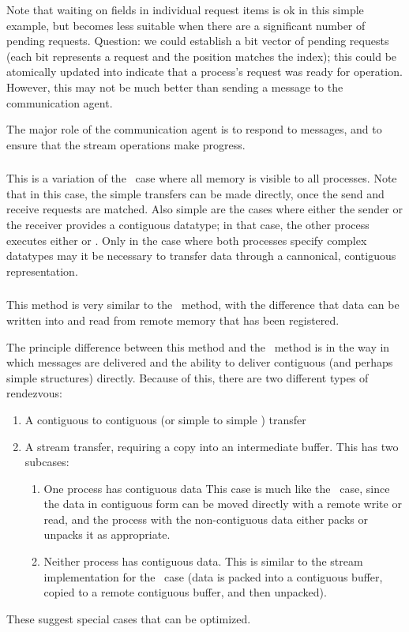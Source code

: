 Note that waiting on fields in individual request items is ok in this simple
example, but becomes less suitable when there are a significant number of
pending requests.  Question: we could establish a bit vector of pending
requests (each bit represents a request and the position matches the index);
this could be atomically updated into indicate that a process's 
request was ready for operation.  However, this may not be much better than
sending a message to the communication agent.

The major role of the communication agent is to respond to messages, and to
ensure that the stream operations make progress.

\subsubsection{\shmemallname}
This is a variation of the \shmemname\ case where all memory is visible to all
processes.  Note that in this case, the simple transfers can be
made directly, once the send and receive requests are matched.  Also simple
are the cases where either the sender or the receiver provides a contiguous
datatype; in that case, the other process executes either
 or .  Only in the case where both
processes specify complex datatypes may it be necessary to transfer data
through a cannonical, contiguous representation.

\subsubsection{\vianame}

This method is very similar to the \tcpname\ method, with the difference that
data can be written into and read from remote memory that has been registered.

The principle difference between this method and the \tcpname\ method is in
the way in which messages are delivered and the ability to deliver contiguous
(and perhaps simple  structures) directly.  Because of this, there
are two different types of rendezvous:
\begin{enumerate}
\item A contiguous to contiguous (or simple  to simple
  ) transfer 
\item A stream transfer, requiring a copy into an intermediate buffer.
  This has two subcases:
  \begin{enumerate}
  \item One process has contiguous data
  This case is much like the \shmemname\ case, since the data in contiguous
  form can be moved directly with a remote write or read, and the process with
  the non-contiguous data either packs or unpacks it as appropriate.
  \item Neither process has contiguous data.  This is similar to the
  stream implementation for the \tcpname\ case (data is packed into a
  contiguous buffer, copied to a remote contiguous buffer, and then unpacked).
  \end{enumerate}
\end{enumerate}
These suggest special cases that can be optimized.

